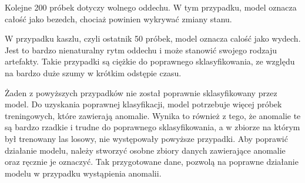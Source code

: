 \documentclass{article}
\begin{document}
Kolejne 200 próbek dotyczy wolnego oddechu. W tym przypadku, model oznacza całość jako bezedch, chociaż powinien wykrywać zmiany stanu. 

W przypadku kaszlu, czyli ostatnik 50 próbek, model oznacza calość jako wydech. Jest to bardzo nienaturalny rytm oddechu i może stanowić swojego rodzaju artefakty. Takie przypadki są ciężkie do poprawnego sklasyfikowania, ze względu na bardzo duże szumy w krótkim odstępie czasu.

Żaden z powyższych przypadków nie został poprawnie sklasyfikowany przez model. Do uzyskania poprawnej klasyfikacji, model potrzebuje więcej próbek treningowych, które zawierają anomalie. Wynika to również z tego, że anomalie te są bardzo rzadkie i trudne do poprawnego sklasyfikowania, a w zbiorze na którym był trenowany las losowy, nie występowały powyższe przypadki. Aby poprawić działanie modelu, należy stworzyć osobne zbiory danych zawierające anomalie oraz ręcznie je oznaczyć. Tak przygotowane dane, pozwolą na poprawne działanie modelu w przypadku wystąpienia anomalii.
\end{document}
